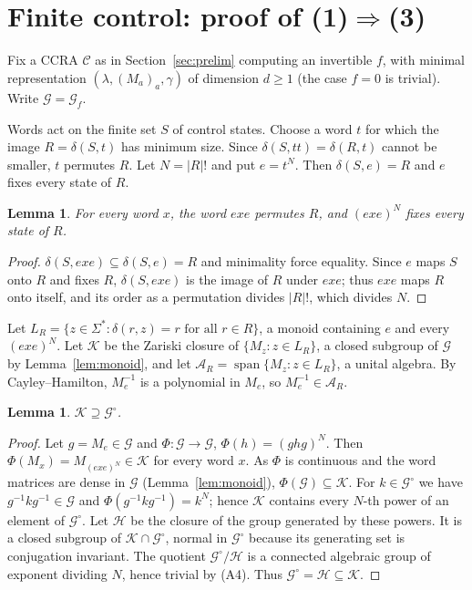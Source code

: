 \documentclass[acmlarge,screen,11pt,nonacm,natbib=false]{acmart}
\newcommand{\cG}{\mathcal{G}}
\newcommand{\cK}{\mathcal{K}}
\newcommand{\cH}{\mathcal{H}}
\newcommand{\cA}{\mathcal{A}}
\newcommand{\spn}{\operatorname{span}}
\newtheorem{lemma}[theorem]{Lemma}
\theoremstyle{definition}
\begin{document}
\section{Finite control: proof of (1)\texorpdfstring{$\Rightarrow$}{=>}(3)}\label{sec:control}
Fix a CCRA $\mathcal C$ as in Section~\ref{sec:prelim} computing an invertible $f$, with minimal representation $(\lambda,(M_a)_a,\gamma)$ of dimension $d\ge1$ (the case $f=0$ is trivial). Write $\cG=\cG_f$.

Words act on the finite set $S$ of control states. Choose a word $t$ for which the image $R=\delta(S,t)$ has minimum size. Since $\delta(S,tt)=\delta(R,t)$ cannot be smaller, $t$ permutes $R$. Let $N=|R|!$ and put $e=t^N$. Then $\delta(S,e)=R$ and $e$ fixes every state of $R$.

\begin{lemma}\label{lem:return}
For every word $x$, the word $exe$ permutes $R$, and $(exe)^N$ fixes every state of $R$.
\end{lemma}
\begin{proof}
$\delta(S,exe)\subseteq\delta(S,e)=R$ and minimality force equality. Since $e$ maps $S$ onto $R$ and fixes $R$, $\delta(S,exe)$ is the image of $R$ under $exe$; thus $exe$ maps $R$ onto itself, and its order as a permutation divides $|R|!$, which divides $N$.
\end{proof}

Let $L_R=\{z\in\Sigma^*:\delta(r,z)=r\text{ for all }r\in R\}$, a monoid containing $e$ and every $(exe)^N$. Let $\cK$ be the Zariski closure of $\{M_z:z\in L_R\}$, a closed subgroup of $\cG$ by Lemma~\ref{lem:monoid}, and let $\cA_R=\spn\{M_z:z\in L_R\}$, a unital algebra. By Cayley--Hamilton, $M_e^{-1}$ is a polynomial in $M_e$, so $M_e^{-1}\in\cA_R$.

\begin{lemma}\label{lem:dense}
$\cK\supseteq\cG^\circ$.
\end{lemma}
\begin{proof}
Let $g=M_e\in\cG$ and $\Phi:\cG\to\cG$, $\Phi(h)=(ghg)^N$. Then $\Phi(M_x)=M_{(exe)^N}\in\cK$ for every word $x$. As $\Phi$ is continuous and the word matrices are dense in $\cG$ (Lemma~\ref{lem:monoid}), $\Phi(\cG)\subseteq\cK$. For $k\in\cG^\circ$ we have $g^{-1}kg^{-1}\in\cG$ and $\Phi(g^{-1}kg^{-1})=k^N$; hence $\cK$ contains every $N$-th power of an element of $\cG^\circ$. Let $\cH$ be the closure of the group generated by these powers. It is a closed subgroup of $\cK\cap\cG^\circ$, normal in $\cG^\circ$ because its generating set is conjugation invariant. The quotient $\cG^\circ/\cH$ is a connected algebraic group of exponent dividing $N$, hence trivial by (A4). Thus $\cG^\circ=\cH\subseteq\cK$.
\end{proof}
\end{document}
